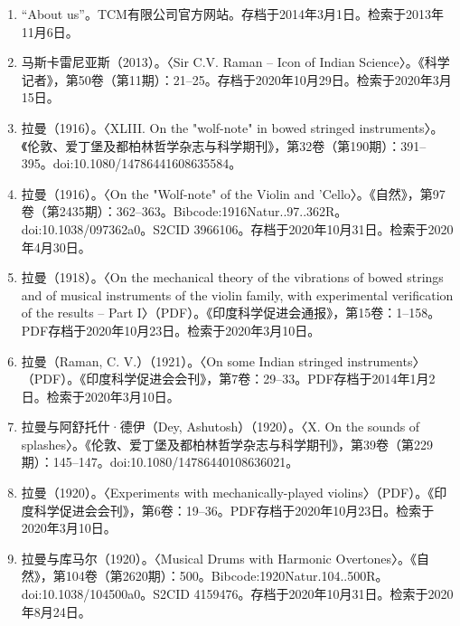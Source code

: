 \begin{enumerate}
\item “About us”。TCM有限公司官方网站。存档于2014年3月1日。检索于2013年11月6日。
\item 马斯卡雷尼亚斯（2013）。〈Sir C.V. Raman – Icon of Indian Science〉。《科学记者》，第50卷（第11期）：21–25。存档于2020年10月29日。检索于2020年3月15日。
\item 拉曼（1916）。〈XLIII. On the "wolf-note" in bowed stringed instruments〉。《伦敦、爱丁堡及都柏林哲学杂志与科学期刊》，第32卷（第190期）：391–395。doi:10.1080/14786441608635584。
\item 拉曼（1916）。〈On the "Wolf-note" of the Violin and 'Cello〉。《自然》，第97卷（第2435期）：362–363。Bibcode:1916Natur..97..362R。doi:10.1038/097362a0。S2CID 3966106。存档于2020年10月31日。检索于2020年4月30日。
\item 拉曼（1918）。〈On the mechanical theory of the vibrations of bowed strings and of musical instruments of the violin family, with experimental verification of the results – Part I〉（PDF）。《印度科学促进会通报》，第15卷：1–158。PDF存档于2020年10月23日。检索于2020年3月10日。
\item 拉曼（Raman, C. V.）（1921）。〈On some Indian stringed instruments〉（PDF）。《印度科学促进会会刊》，第7卷：29–33。PDF存档于2014年1月2日。检索于2020年3月10日。
\item 拉曼与阿舒托什·德伊（Dey, Ashutosh）（1920）。〈X. On the sounds of splashes〉。《伦敦、爱丁堡及都柏林哲学杂志与科学期刊》，第39卷（第229期）：145–147。doi:10.1080/14786440108636021。
\item 拉曼（1920）。〈Experiments with mechanically-played violins〉（PDF）。《印度科学促进会会刊》，第6卷：19–36。PDF存档于2020年10月23日。检索于2020年3月10日。
\item 拉曼与库马尔（1920）。〈Musical Drums with Harmonic Overtones〉。《自然》，第104卷（第2620期）：500。Bibcode:1920Natur.104..500R。doi:10.1038/104500a0。S2CID 4159476。存档于2020年10月31日。检索于2020年8月24日。

\end{enumerate}